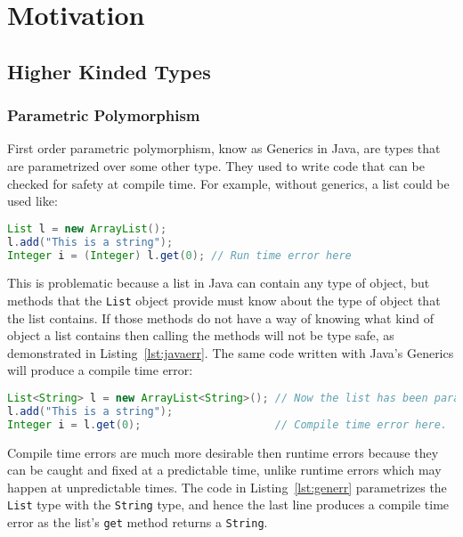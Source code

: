 \chapter{Motivation}\label{sec:background}

\section{Higher Kinded Types}

\subsection{Parametric Polymorphism}\label{sec:generics}
First order parametric polymorphism, know as Generics in Java, are types that 
are parametrized over some other type. They used to write code that can be
checked for safety at compile time. For example, without generics, a list could
be used like:

\begin{lstlisting}[caption=Runtime error that could be avoided, language=Java, label={lst:javaerr}]
List l = new ArrayList();
l.add("This is a string");
Integer i = (Integer) l.get(0); // Run time error here
\end{lstlisting}

This is problematic because a list in Java can contain any type of object, but
methods that the \lstinline{List} object provide must know about the type of
object that the list contains. If those methods do not have a way of knowing
what kind of object a list contains then calling the methods will not be type
safe, as demonstrated in Listing~\ref{lst:javaerr}. The same code written with
Java's Generics will produce a compile time error:

\begin{lstlisting}[caption=Compile time error, language=Java, label={lst:generr}]
List<String> l = new ArrayList<String>(); // Now the list has been parametrized with a type
l.add("This is a string");
Integer i = l.get(0);                     // Compile time error here.
\end{lstlisting}

Compile time errors are much more desirable then runtime errors because they
can be caught and fixed at a predictable time, unlike runtime errors which may
happen at unpredictable times. The code in Listing~\ref{lst:generr} parametrizes
the \lstinline{List} type with the \lstinline{String} type, and hence the last
line produces a compile time error as the list's \lstinline{get} method returns
a \lstinline{String}. 

